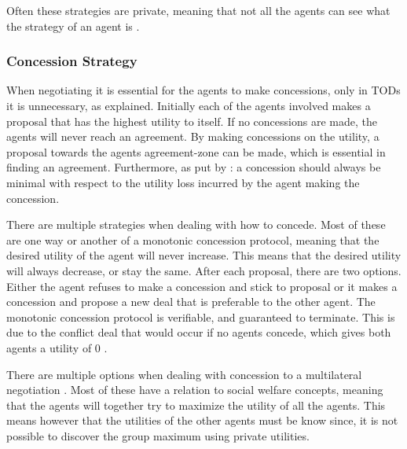 Often these strategies are private, meaning that not all the agents can see what the strategy of an agent is \citep{fatima2004agenda}. 

\subsubsection{Concession Strategy}
\label{sec:concessionstrat}
When negotiating it is essential for the agents to make concessions, only in TODs it is unnecessary, as explained. Initially each of the agents involved makes a proposal that has the highest utility to itself. If no concessions are made, the agents will never reach an agreement. By making concessions on the utility, a proposal towards the agents agreement-zone can be made, which is essential in finding an agreement. Furthermore, as put by \citet{endriss2006monotonic}: a concession should always be minimal with respect to the utility loss incurred by the agent making the concession.

There are multiple strategies when dealing with how to concede. Most of these are one way or another of a monotonic concession protocol, meaning that the desired utility of the agent will never increase. This means that the desired utility will always decrease, or stay the same. After each proposal, there are two options. Either the agent refuses to make a concession and stick to proposal or it makes a concession and propose a new deal that is preferable to the other agent. The monotonic concession protocol is verifiable, and guaranteed to terminate. This is due to the conflict deal that would occur if no agents concede, which gives both agents a utility of 0 \cite{endriss2006monotonic}.


There are multiple options when dealing with concession to a multilateral negotiation \citep{endriss2006monotonic}. Most of these have a relation to social welfare concepts, meaning that the agents will together try to maximize the utility of all the agents. This means however that the utilities of the other agents must be know since, it is not possible to discover the group maximum using private utilities.


